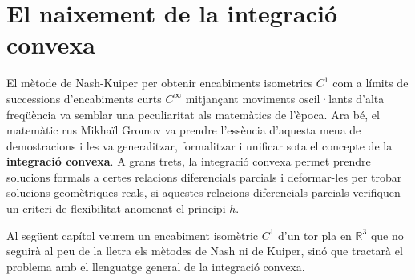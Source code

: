 \section{El naixement de la integració convexa}
El mètode de Nash-Kuiper per obtenir encabiments isometrics $C^1$ com a límits de successions d'encabiments curts $C^\infty$ mitjançant moviments oscil·lants d'alta freqüència va semblar una peculiaritat als matemàtics de l'època. Ara bé, el matemàtic rus Mikhaïl Gromov va prendre l'essència d'aquesta mena de demostracions i les va generalitzar, formalitzar i unificar sota el concepte de la \textbf{integració convexa}. A grans trets, la integració convexa permet prendre solucions formals a certes relacions diferencials parcials i deformar-les per trobar solucions geomètriques reals, si aquestes relacions diferencials parcials verifiquen un criteri de flexibilitat anomenat el principi $h$.

Al següent capítol veurem un encabiment isomètric $C^1$ d'un tor pla en $\mathbb R^3$ que no seguirà al peu de la lletra els mètodes de Nash ni de Kuiper, sinó que tractarà el problema amb el llenguatge general de la integració convexa. 